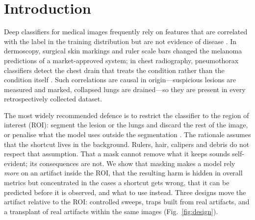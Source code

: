 \documentclass[review,3p]{elsarticle}
\begin{document}
\section{Introduction}
Deep classifiers for medical images frequently rely on features that are correlated with the label in the
training distribution but are not evidence of disease \citep{geirhos2020shortcut,degrave2021ai}. In dermoscopy,
surgical skin markings \citep{winkler2019markings} and ruler scale bars \citep{winkler2021scalebars} changed
the melanoma predictions of a market-approved system; in chest radiography, pneumothorax classifiers detect the
chest drain that treats the condition rather than the condition itself
\citep{oakden2020hidden,rueckel2021pneumothorax,jimenez2023shortcuts,zech2018variable}. Such correlations are causal in origin---suspicious lesions are
measured and marked, collapsed lungs are drained---so they are present in every retrospectively collected dataset.

The most widely recommended defence is to restrict the classifier to the region of interest (ROI): segment the
lesion or the lungs and discard the rest of the image, or penalise what the model uses outside the segmentation
\citep{maron2021confounding,bassi2024isnet}. The rationale assumes that the shortcut lives in the
background. Rulers, hair, calipers and debris do not respect that assumption. That a mask cannot remove what it keeps
sounds self-evident; its consequences are not. We show that masking makes a model rely \emph{more} on an artifact
inside the ROI, that the resulting harm is hidden in overall metrics but concentrated in the cases a shortcut gets
wrong, that it can be predicted before it is observed, and what to use instead. Three designs move the artifact
relative to the ROI: controlled sweeps, traps built from real artifacts, and a transplant of real artifacts within the
same images (Fig.~\ref{fig:design}).
\end{document}
